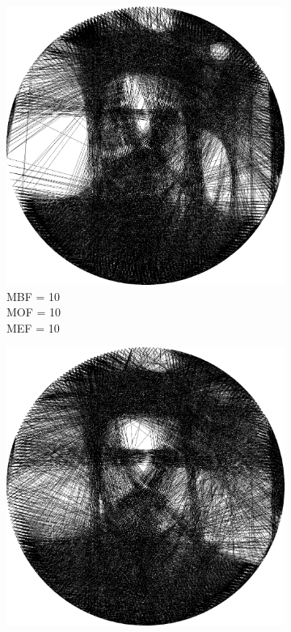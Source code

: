 \begin{figure}[htb]
\begin{subfigure}{0.24\textwidth}
        \includegraphics[width = \textwidth]{img/4-mine/taco-thread/taco_e_i3000_c20_inv0_bg10_obj10_ed10.png}
        \caption{MBF = 10 \\ MOF = 10 \\ MEF = 10}
        \label{mine-param-taco-thread-c}
    \end{subfigure}
    \begin{subfigure}{0.24\textwidth}
        \centering
        \includegraphics[width = \textwidth]{img/4-mine/taco-thread/taco_e_i3000_c20_inv0_bg10_obj1_ed1.png}

\end{subfigure}
\end{figure}
